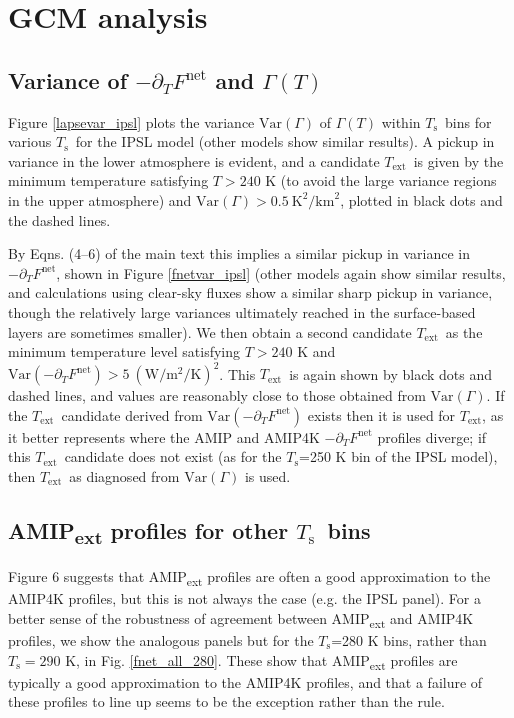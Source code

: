 \documentclass[9pt,twoside,lineno]{pnas-new}
\newcommand{\ppt}{\ensuremath{\partial_T}}
\newcommand{\Fnet}{\ensuremath{F^\mathrm{net}}}
\newcommand{\Wmsq}{\ensuremath{\mathrm{W/m^2}}}
\newcommand{\km}{\ensuremath{\mathrm{km}}}
\newcommand{\Kelvin}{\ensuremath{\mathrm{K}}}
\newcommand{\Ts}{\ensuremath{T_\mathrm{s}}}
\newcommand{\Text}{\ensuremath{T_\mathrm{ext}}}
\begin{document}

\section{GCM analysis}

\subsection{Variance of $-\ppt \Fnet$ and $\Gamma(T)$}
\label{sec_pptfvar}
Figure \ref{lapsevar_ipsl} plots the variance $\mathrm{Var}(\Gamma)$ of $\Gamma(T)$ within \Ts\ bins for various \Ts\ for the IPSL model (other models show similar results). A  pickup in variance in the lower atmosphere is evident, and a candidate \Text\ is given by the minimum temperature satisfying $T > 240$ K (to avoid the large variance regions in the upper atmosphere) and $\mathrm{Var}(\Gamma) > 0.5 \ \Kelvin^2/\km^2$, plotted in black dots and the dashed lines. 

 By Eqns. (4--6) of the main text this implies a similar pickup in variance in $-\ppt\Fnet$, shown in Figure \ref{fnetvar_ipsl} (other models again show similar results, and calculations using clear-sky fluxes show a similar sharp pickup in variance, though the relatively large variances ultimately reached in the surface-based layers are sometimes smaller).  We then obtain a second candidate \Text\ as the minimum temperature level satisfying $T > 240$ K  and $\mathrm{Var}(-\ppt \Fnet) > 5\ (\Wmsq/\Kelvin)^2$. This \Text\ is again shown by black dots and dashed lines, and values are reasonably close to those obtained from $\mathrm{Var}(\Gamma)$.  If the \Text\ candidate derived from $\mathrm{Var}(-\ppt \Fnet)$ exists then it is used for \Text, as it better represents where the AMIP and AMIP4K $-\ppt\Fnet$ profiles diverge; if this \Text\ candidate does not exist  (as for the \Ts=250 K bin of the IPSL model), then \Text\ as diagnosed from $\mathrm{Var}(\Gamma)$ is used.

\subsection{AMIP\textsubscript{ext} profiles for other \Ts\ bins}
Figure 6  suggests that AMIP\textsubscript{ext} profiles are often a good approximation to the AMIP4K profiles, but this is not always the case (e.g. the IPSL panel). For a better sense of the robustness of agreement between AMIP\textsubscript{ext} and AMIP4K profiles,  we show the analogous panels but for the \Ts=280 K bins, rather than $\Ts=290$ K, in Fig. \ref{fnet_all_280}. These show  that AMIP\textsubscript{ext} profiles are typically a good approximation to the AMIP4K profiles, and that a failure of these profiles to line up seems to be the exception rather than the rule.
\end{document}

